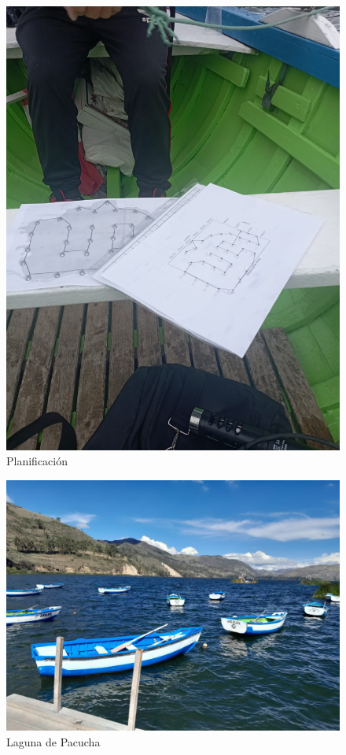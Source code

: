 \begin{figure}
    \centering
    \includegraphics[width=0.7\linewidth]{Anexos/planning.jpeg}
    \caption{Planificación }
    \label{fig:enter-label}
\end{figure}

\begin{figure}
    \centering
    \includegraphics[width=0.9\linewidth]{Anexos/laguna.jpeg}
    \caption{Laguna de Pacucha}
    \label{fig:enter-label}
\end{figure}

